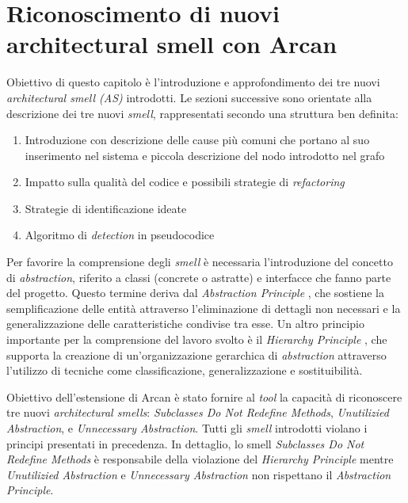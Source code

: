 \section{Riconoscimento di nuovi architectural smell con Arcan}

Obiettivo di questo capitolo è l'introduzione e approfondimento dei tre nuovi \textit{architectural smell (AS)} introdotti. Le sezioni successive sono orientate alla descrizione dei tre nuovi \textit{smell}, rappresentati secondo una struttura ben definita:
\begin{enumerate}
    \item Introduzione con descrizione delle cause più comuni che portano al suo inserimento nel sistema e piccola descrizione del nodo introdotto nel grafo
    \item Impatto sulla qualità del codice e possibili strategie di \textit{refactoring}
    \item Strategie di identificazione ideate
    \item Algoritmo di \textit{detection} in pseudocodice
\end{enumerate}
Per favorire la comprensione degli \textit{smell} è necessaria l'introduzione del concetto di \textit{abstraction}, riferito a classi (concrete o astratte) e interfacce che fanno parte del progetto. Questo termine deriva dal \textit{Abstraction Principle} \cite{booch2008object}, che sostiene la semplificazione delle entità attraverso l'eliminazione di dettagli non necessari e la generalizzazione delle caratteristiche condivise tra esse. Un altro principio importante per la comprensione del lavoro svolto è il \textit{Hierarchy Principle} \cite{booch2008object}, che supporta la creazione di un'organizzazione gerarchica di \textit{abstraction} attraverso l'utilizzo di tecniche come classificazione, generalizzazione e sostituibilità.

Obiettivo dell'estensione di Arcan è stato fornire al \textit{tool} la capacità di riconoscere tre nuovi \textit{architectural smells}: \textit{Subclasses Do Not Redefine Methods}, \textit{Unutilizied Abstraction}, e \textit{Unnecessary Abstraction}. 
Tutti gli \textit{smell} introdotti violano i principi presentati in precedenza. In dettaglio, lo smell \textit{Subclasses Do Not Redefine Methods} è responsabile della violazione del \textit{Hierarchy Principle} mentre \textit{Unutilizied Abstraction} e \textit{Unnecessary Abstraction} non rispettano il \textit{Abstraction Principle}.


%







